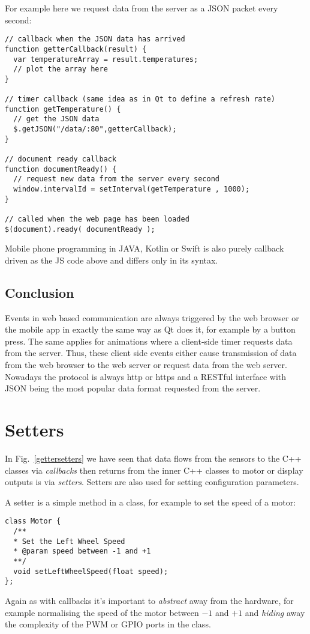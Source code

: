 \documentclass[12pt]{report}
\begin{document}
For example here we request data from the server as a JSON
packet every second:

\begin{verbatim}
// callback when the JSON data has arrived
function getterCallback(result) {
  var temperatureArray = result.temperatures;
  // plot the array here
}

// timer callback (same idea as in Qt to define a refresh rate)
function getTemperature() {
  // get the JSON data
  $.getJSON("/data/:80",getterCallback);
}

// document ready callback
function documentReady() {
  // request new data from the server every second
  window.intervalId = setInterval(getTemperature , 1000);
}

// called when the web page has been loaded
$(document).ready( documentReady );
\end{verbatim}

Mobile phone programming in JAVA, Kotlin or Swift is also purely
callback driven as the JS code above and differs only in its syntax.

\section{Conclusion}
Events in web based communication are always triggered by the web
browser or the mobile app in exactly the same way as Qt does it, for
example by a button press. The same applies for animations where a
client-side timer requests data from the server. Thus, these client
side events either cause transmission of data from the web browser to
the web server or request data from the web server. Nowadays the protocol is
always http or https and a RESTful interface with JSON
being the most popular data format requested from the server.


\chapter{Setters\label{setters}}
In Fig.~\ref{gettersetters} we have seen that data flows from
the sensors to the C++ classes via \textsl{callbacks} then returns
from the inner C++ classes to motor or display outputs is via
\textsl{setters}. Setters are also used for setting configuration
parameters.

A setter is a simple method in a class, for example to set the
speed of a motor:
\begin{verbatim}
class Motor {
  /**
  * Set the Left Wheel Speed
  * @param speed between -1 and +1
  **/
  void setLeftWheelSpeed(float speed);
};
\end{verbatim}
Again as with callbacks it's important to \textsl{abstract} away from the
hardware, for example normalising the speed of the
motor between $-1$ and $+1$ and \textsl{hiding} away the complexity of the
PWM or GPIO ports in the class.
\end{document}
